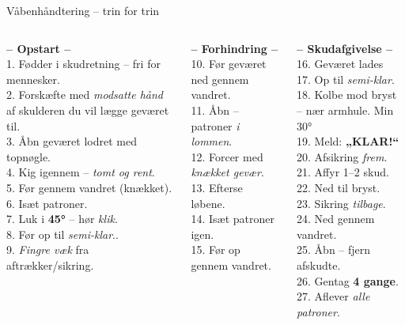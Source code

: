 \begin{frame}{Våbenhåndtering – trin for trin}
  \vspace{0.2em}
  \begin{columns}[T]
    \setlength{\parskip}{0.32em}
    \footnotesize
    \RaggedRight

    \textbf{-- Opstart --} \\
    1. Fødder i skudretning – fri for mennesker. \\
    2. Forskæfte med \textit{modsatte hånd} af skulderen du vil lægge geværet til. \\
    3. Åbn geværet lodret med topnøgle. \\
    4. Kig igennem – \textit{tomt og rent}. \\
    5. Før gennem vandret (knækket). \\
    6. Isæt patroner. \\
    7. Luk i \textbf{45°} – hør \textit{klik}. \\
    8. Før op til \textit{semi-klar}.. \\
    9. \textit{Fingre væk} fra aftrækker/sikring. \par

    \vspace{0.4em}
    \textbf{-- Forhindring --} \\
    10. Før geværet ned gennem vandret. \\
    11. Åbn – patroner \textit{i lommen}. \\
    12. Forcer med \textit{knækket gevær}. \\
    13. Efterse løbene. \\
    14. Isæt patroner igen. \\
    15. Før op gennem vandret. \par

    \setlength{\parskip}{0.32em}
    \footnotesize
    \RaggedRight

    \textbf{-- Skudafgivelse --} \\
    16. Geværet lades \\
    17. Op til \textit{semi-klar}. \\
    18. Kolbe mod bryst – nær armhule. Min 30° \\
    19. Meld: \textbf{„KLAR!“} \\
    20. Afsikring \textit{frem}. \\
    21. Affyr 1–2 skud. \\
    22. Ned til bryst. \\
    23. Sikring \textit{tilbage}. \\
    24. Ned gennem vandret. \\
    25. Åbn – fjern afskudte. \\
    26. Gentag \textbf{4 gange}. \\
    27. Aflever \textit{alle patroner}. \par

  \end{columns}
\end{frame}

